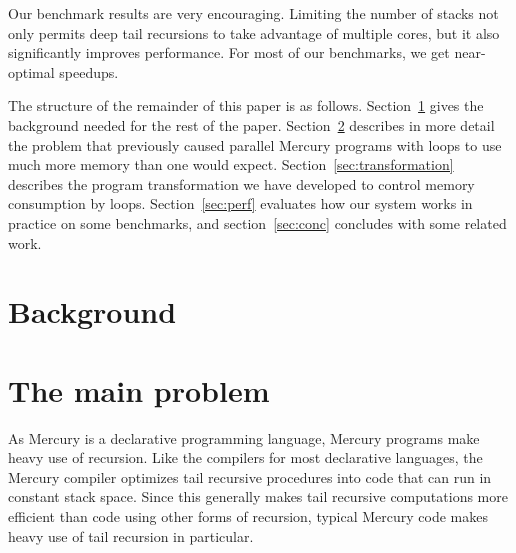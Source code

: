 Our benchmark results are very encouraging.
Limiting the number of stacks
not only permits deep tail recursions to take advantage of multiple cores,
but it also significantly improves performance.
For most of our benchmarks, we get near-optimal speedups.

The structure of the remainder of this paper is as follows.
Section~\ref{sec:background} gives
the background needed for the rest of the paper.
Section~\ref{sec:problem} describes in more detail
the problem that previously caused parallel Mercury programs with loops
to use much more memory than one would expect.
Section~\ref{sec:transformation} describes
the program transformation we have developed
to control memory consumption by loops.
Section~\ref{sec:perf} evaluates
how our system works in practice on some benchmarks,
and
section~\ref{sec:conc} concludes with some related work.

\section{Background}
\label{sec:background}



\section{The main problem}
\label{sec:problem}

As Mercury is a declarative programming language,
Mercury programs make heavy use of recursion.
Like the compilers for most declarative languages,
the Mercury compiler optimizes tail recursive procedures
into code that can run in constant stack space.
Since this generally makes tail recursive computations
more efficient than code using other forms of recursion,
typical Mercury code makes heavy use of tail recursion in particular.

